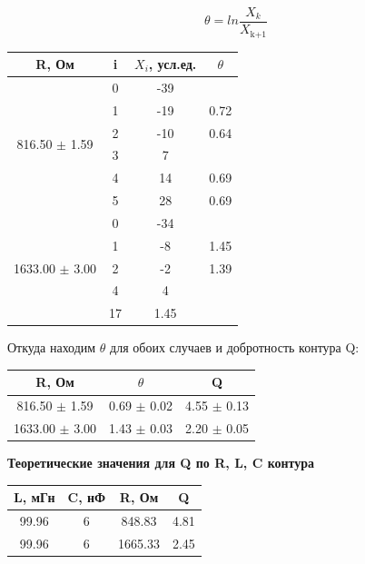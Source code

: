 \documentclass[a4paper,12pt]{article}
\begin{document}
$$ \theta = ln\frac{X_k}{X_{\text{k+1}}} $$

\begin{center}
\begin{tabular}{|c|c|c|c|}
	\hline
	R, Ом & i & $X_i$, усл.ед. & $\theta$ \\
	\hline
	\multirow{6}{*}{816.50 $\pm$ 1.59} & 0 & -39 & \\
	\cline{2-4} & 1 & -19 & 0.72 \\
	\cline{2-4} & 2 & -10 & 0.64 \\
	\cline{2-4} & 3 & 7 &  \\
	\cline{2-4} & 4 & 14 & 0.69 \\
	\cline{2-4} & 5 & 28 & 0.69 \\
	\hline
	\multirow{5}{*}{1633.00 $\pm$ 3.00} & 0 & -34 & \\
	\cline{2-4} & 1 & -8 & 1.45 \\
	\cline{2-4} & 2 & -2 & 1.39 \\
	\cline{2-4} & 4 & 4 & \\
	\cline{2-4} & 17 & 1.45 \\
	\hline
\end{tabular}
\end{center}

\par Откуда находим $\theta$ для обоих случаев и добротность контура Q:

\begin{center}
\begin{tabular}{|c|c|c|}
	\hline
	R, Ом & $\theta$ & Q \\
	\hline
	816.50 $\pm$ 1.59 & 0.69 $\pm$ 0.02 & 4.55 $\pm$ 0.13 \\
	\hline
	1633.00 $\pm$ 3.00 & 1.43 $\pm$ 0.03 & 2.20 $\pm$ 0.05 \\
	\hline
\end{tabular} 
\end{center}

\par\textbf{Теоретические значения для Q по R, L, C контура} 

\begin{center}
\begin{tabular}{|c|c|c|c|}
	\hline
	L, мГн & C, нФ & R, Ом & Q \\
	\hline
	99.96 & 6 & 848.83 & 4.81 \\
	\hline
	99.96 & 6 & 1665.33 & 2.45\\
	\hline
\end{tabular}
\end{center}
\end{document}
